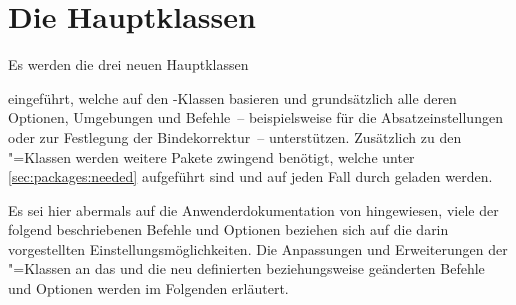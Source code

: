 \chapter[Die Klassen tudscrbook, tudscrreprt und tudscrartcl]{Die Hauptklassen}
\begin{Declaration*}{}
\begin{Declaration*}{}
\begin{Declaration*}{}
Es werden die drei neuen Hauptklassen
%
\begin{description}
\item {}
\item {}
\item {}
\end{description}
%
eingeführt, welche auf den \KOMAScript-Klassen basieren und grundsätzlich alle
deren Optionen, Umgebungen und Befehle~-- beispielsweise  für 
die Absatzeinstellungen oder  zur Festlegung der Bindekorrektur~-- 
unterstützen. Zusätzlich zu den \KOMAScript"=Klassen werden weitere Pakete 
zwingend benötigt, welche unter \autoref{sec:packages:needed} aufgeführt sind 
und auf jeden Fall durch \TUDScript geladen werden.

Es sei hier abermals auf die Anwenderdokumentation \scrguide von \KOMAScript{} 
hingewiesen, viele der folgend beschriebenen Befehle und Optionen beziehen sich 
auf die darin vorgestellten Einstellungsmöglichkeiten. Die Anpassungen und 
Erweiterungen der \KOMAScript"=Klassen an das \CD und die neu definierten 
beziehungsweise geänderten Befehle und Optionen werden im Folgenden erläutert.
\end{Declaration*}
\end{Declaration*}
\end{Declaration*}

